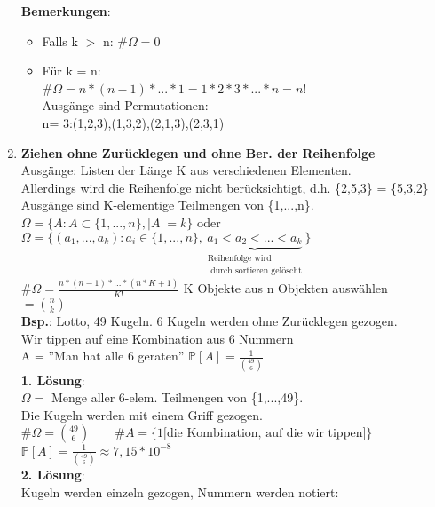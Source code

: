 \begin{enumerate}
\begin{itemize}
	\end{itemize}
\textbf{Bemerkungen}: 
\begin{itemize}
	\item Falls k $>$ n: \#$\Omega = 0$
	\item Für k = n:\\
	\#$\Omega = n*(n-1)*...*1 = 1*2*3*...*n = n!$\\Ausgänge sind Permutationen:\\n= 3:(1,2,3),(1,3,2),(2,1,3),(2,3,1)
\end{itemize}
	\item \textbf{Ziehen ohne Zurücklegen und ohne Ber. der Reihenfolge}\\
	Ausgänge: Listen der Länge K aus verschiedenen Elementen.\\
	Allerdings wird die Reihenfolge nicht berücksichtigt, d.h. \{2,5,3\} = \{5,3,2\}\smallskip\\
	Ausgänge sind K-elementige Teilmengen von \{1,...,n\}.\\
	$\Omega = \{A:A\subset\{1,...,n\},|A| = k\}$ oder \\
	$\Omega = \{(a_1,...,a_k):a_i \in \{1,...,n\},\underbrace{a_1<a_2<...<a_k}_{\substack{\text{Reihenfolge wird}\\\text{ durch sortieren gelöscht}}} \}$\medskip\\
	\#$\Omega = \frac{n*(n-1)*...*(n*K+1)}{K!}$ \hspace{0.5cm}K Objekte aus n Objekten auswählen\smallskip\\
	 $ = \binom{n}{k}$\medskip\\
	 \textbf{Bsp.}: Lotto, 49 Kugeln. 6 Kugeln werden ohne Zurücklegen gezogen.\\ 
	 Wir tippen auf eine Kombination aus 6 Nummern\smallskip\\
	 A = ''Man hat alle 6 geraten'' $\mathds{P}[A] = \frac{1}{\binom{49}{6}}$\medskip\\
	 \textbf{1. Lösung}:\\
	 $\Omega = $ Menge aller 6-elem. Teilmengen von \{1,...,49\}. \\
	 Die Kugeln werden mit einem Griff gezogen.\medskip\\
	 \#$\Omega = \binom{49}{6} \qquad \#A = \{1 \text{[die Kombination, auf die wir tippen]}\}$\\
	 $\mathds{P}[A] = \frac{1}{\binom{49}{6}} \approx 7,15*10^{-8}$\medskip\\
	 \textbf{2. Lösung}:\\
	 Kugeln werden einzeln gezogen, Nummern werden notiert:\\

\end{enumerate}
